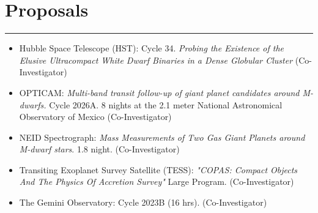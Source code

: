 \documentclass[letterpaper,10pt]{article}
\begin{document}
\section*{Proposals}       

\hrule
\vspace{.3 cm}






  \begin{itemize}[label=$\blacktriangleright$]
      \item Hubble Space Telescope (HST):  Cycle 34. \emph{  Probing the Existence of the Elusive Ultracompact White Dwarf Binaries in a Dense Globular Cluster} (Co-Investigator)
  \end{itemize}

\begin{itemize}[label=$\blacktriangleright$]
      \item   OPTICAM: \emph{Multi-band transit follow-up of giant planet candidates around M-dwarfs.} Cycle 2026A. 8 nights at the 2.1 meter National Astronomical Observatory of Mexico  (Co-Investigator)
  \end{itemize}
\begin{itemize}[label=$\blacktriangleright$]

  \item NEID Spectrograph: \emph{Mass Measurements of Two Gas Giant Planets around M-dwarf stars}. 1.8 night. (Co-Investigator)
  \end{itemize}

\begin{itemize}[label=$\blacktriangleright$]
      \item   Transiting Exoplanet Survey Satellite (TESS): \emph{"COPAS: Compact Objects And The Physics Of Accretion Survey"} Large Program. (Co-Investigator)
  \end{itemize}

\begin{itemize}[label=$\blacktriangleright$]
      \item   The Gemini Observatory:  Cycle 2023B (16 hrs). (Co-Investigator)
  \end{itemize}
\end{document}
